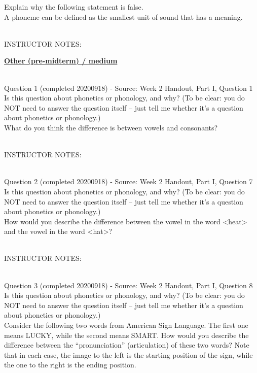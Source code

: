 \documentclass[12pt]{article}
\begin{document}
Explain why the following statement is false.\\

A phoneme can be defined as the smallest unit of sound that has a meaning.


~\\
INSTRUCTOR NOTES: 


\newpage\textbf{\underline{\huge Other (pre-midterm) / medium\\}}

~\\

{\large Question 1} (completed 20200918) - Source: Week 2 Handout, Part I, Question 1\\

Is this question about phonetics or phonology, and why? (To be clear: you do NOT need to answer the question itself -- just tell me whether it's a question about phonetics or phonology.)\\

What do you think the difference is between vowels and consonants?


~\\
INSTRUCTOR NOTES: 


~\\

{\large Question 2} (completed 20200918) - Source: Week 2 Handout, Part I, Question 7\\

Is this question about phonetics or phonology, and why? (To be clear: you do NOT need to answer the question itself -- just tell me whether it's a question about phonetics or phonology.)\\

How would you describe the difference between the vowel in the word <heat> and the vowel in the word <hat>?


~\\
INSTRUCTOR NOTES: 


~\\

{\large Question 3} (completed 20200918) - Source: Week 2 Handout, Part I, Question 8\\

Is this question about phonetics or phonology, and why? (To be clear: you do NOT need to answer the question itself -- just tell me whether it's a question about phonetics or phonology.)\\

Consider the following two words from American Sign Language. The first one means LUCKY, while the second means SMART. How would you describe the difference between the ``pronunciation'' (articulation) of these two words? Note that in each case, the image to the left is the starting position of the sign, while the one to the right is the ending position.
\end{document}
